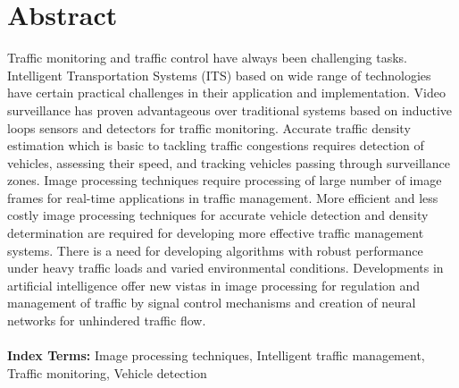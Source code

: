 \documentclass[12pt,a4paper,roman]{article}
\begin{document}
\section{Abstract}
{
Traffic monitoring and traffic control have always been challenging tasks. Intelligent Transportation Systems (ITS) based on wide range of technologies have certain practical challenges in their application and implementation. Video surveillance has proven advantageous over traditional systems based on inductive loops sensors and detectors for traffic monitoring. Accurate traffic density estimation which is basic to tackling traffic congestions requires detection of vehicles, assessing their speed, and tracking vehicles passing through surveillance zones. Image processing techniques require processing of large number of image frames for real-time applications in traffic management. More efficient and less costly image processing techniques for accurate vehicle detection and density determination are required for developing more effective traffic management systems. There is a need for developing algorithms with robust performance under heavy traffic loads and varied environmental conditions. Developments in artificial intelligence offer new vistas in image processing for regulation and management of traffic by signal control mechanisms and creation of neural networks for unhindered traffic flow.
\\\\
\textbf{Index Terms:} Image processing techniques, Intelligent traffic management, Traffic monitoring, Vehicle detection
}
\end{document}
